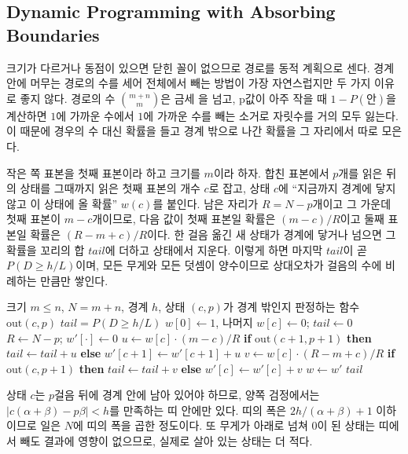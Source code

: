 \subsection{Dynamic Programming with Absorbing Boundaries}

크기가 다르거나 동점이 있으면 닫힌 꼴이 없으므로 경로를 동적 계획으로 센다. 경계 안에 머무는 경로의 수를 세어 전체에서 빼는 방법이 가장 자연스럽지만 두 가지 이유로 좋지 않다. 경로의 수 $\binom{m+n}m$은 금세 을 넘고, p값이 아주 작을 때 $1-P(\text{안})$을 계산하면 $1$에 가까운 수에서 $1$에 가까운 수를 빼는 소거로 자릿수를 거의 모두 잃는다. 이 때문에 경우의 수 대신 확률을 들고 경계 밖으로 나간 확률을 그 자리에서 따로 모은다.

작은 쪽 표본을 첫째 표본이라 하고 크기를 $m$이라 하자. 합친 표본에서 $p$개를 읽은 뒤의 상태를 그때까지 읽은 첫째 표본의 개수 $c$로 잡고, 상태 $c$에 ``지금까지 경계에 닿지 않고 이 상태에 올 확률'' $w(c)$를 붙인다. 남은 자리가 $R=N-p$개이고 그 가운데 첫째 표본이 $m-c$개이므로, 다음 값이 첫째 표본일 확률은 $(m-c)/R$이고 둘째 표본일 확률은 $(R-m+c)/R$이다. 한 걸음 옮긴 새 상태가 경계에 닿거나 넘으면 그 확률을 꼬리의 합 $\mathit{tail}$에 더하고 상태에서 지운다. 이렇게 하면 마지막 $\mathit{tail}$이 곧 $P(D\ge h/L)$이며, 모든 무게와 모든 덧셈이 양수이므로 상대오차가 걸음의 수에 비례하는 만큼만 쌓인다.

\begin{algorithm}[t]
\begin{algorithmic}[1]
\Require 크기 $m\le n$, $N=m+n$, 경계 $h$, 상태 $(c,p)$가 경계 밖인지 판정하는 함수 $\mathrm{out}(c,p)$
\Ensure $\mathit{tail}=P(D\ge h/L)$
\State $w[0]\gets1$, 나머지 $w[c]\gets0$; $\mathit{tail}\gets0$
  \State $R\gets N-p$; $w'[\cdot]\gets0$
    \State $u\gets w[c]\cdot(m-c)/R$ 
    \State \textbf{if} $\mathrm{out}(c+1,p+1)$ \textbf{then} $\mathit{tail}\gets\mathit{tail}+u$ \textbf{else} $w'[c+1]\gets w'[c+1]+u$
    \State $v\gets w[c]\cdot(R-m+c)/R$ 
    \State \textbf{if} $\mathrm{out}(c,p+1)$ \textbf{then} $\mathit{tail}\gets\mathit{tail}+v$ \textbf{else} $w'[c]\gets w'[c]+v$
  \EndFor
  \State $w\gets w'$
\EndFor
\State \Return $\mathit{tail}$
\end{algorithmic}
\caption{흡수 경계가 있는 두 표본 Kolmogorov--Smirnov 분포}
\label{alg:ks-absorb}
\end{algorithm}

상태 $c$는 $p$걸음 뒤에 경계 안에 남아 있어야 하므로, 양쪽 검정에서는 $|c(\alpha+\beta)-p\beta|<h$를 만족하는 띠 안에만 있다. 띠의 폭은 $2h/(\alpha+\beta)+1$ 이하이므로 일은 $N$에 띠의 폭을 곱한 정도이다. 또 무게가 아래로 넘쳐 $0$이 된 상태는 띠에서 빼도 결과에 영향이 없으므로, 실제로 살아 있는 상태는 더 적다.

